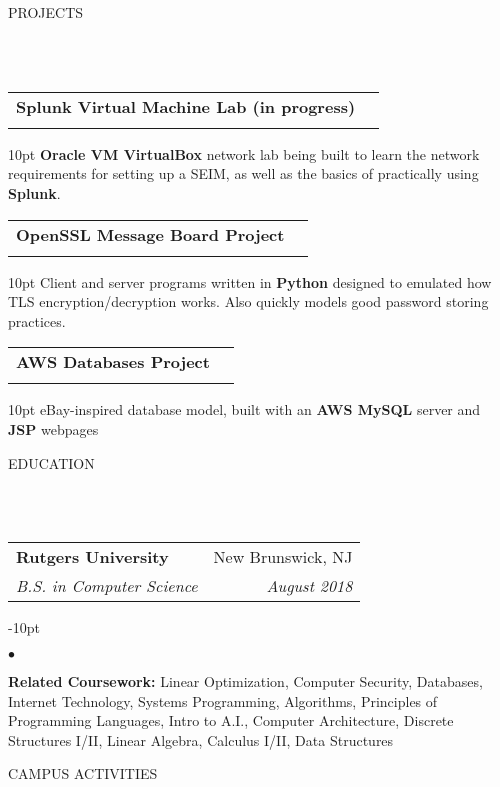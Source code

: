 \documentclass[12pt]{article}
\makeatletter
\newcommand{\header}[1]{
	\vspace*{12pt} %
	{\hspace*{-14pt}\vspace*{6pt} #1}
	\vspace*{-6pt} 
	\lineunder
}
\newcommand{\lineunder}{
	\vspace*{-8pt} \\ 
	\hspace*{-18pt} 
	\hrulefill \\
}
\newcommand{\subheading}[4]{
 	\vspace{5pt}
    	\begin{tabular*}{1.01\textwidth}
    		{l@{\extracolsep{\fill}}r}
      		\hspace{-16pt}\textbf{#1} & #2 \\
      		\hspace{-16pt}\textit{\small#3} & \textit{\small #4} \\
    	\end{tabular*}
    \vspace{-4pt}
}
\newenvironment{achievements}{
\begin{adjustwidth}{-10pt}{}
  \begin{list}{$\bullet$}{
  	\topsep 0pt \itemsep -4pt}}
  	{\vspace*{2pt}\end{list}
\end{adjustwidth}
}
\makeatother
\begin{document}
\header{PROJECTS}


\subheading{Splunk Virtual Machine Lab (in progress)}{}{}{}
	\vspace{-15pt}
	\begin{adjustwidth}{10pt}{}
	\textbf{Oracle VM VirtualBox} network lab being built to learn the network requirements for setting up a SEIM, as well as the basics of practically using \textbf{Splunk}.
	\end{adjustwidth} 

\subheading{OpenSSL Message Board Project}{}{}{}
	\vspace{-15pt}
	\begin{adjustwidth}{10pt}{}
	Client and server programs written in \textbf{Python} designed to emulated how TLS encryption/decryption works. Also quickly models good password storing practices.
	\end{adjustwidth}

\subheading{AWS Databases Project}{}{}{}
	\vspace{-15pt}
	\begin{adjustwidth}{10pt}{}
	eBay-inspired database model, built with an \textbf{AWS MySQL} server and \textbf{JSP} webpages
	\end{adjustwidth}


\header{EDUCATION}

\subheading
	{Rutgers University}{New Brunswick, NJ}
	{B.S. in Computer Science}{August 2018}
	\begin{achievements}	
	\item{\bf Related Coursework:} Linear Optimization, Computer Security, Databases, Internet Technology, Systems Programming, Algorithms, Principles of Programming Languages, Intro to A.I., Computer Architecture, Discrete Structures I/II, Linear Algebra, Calculus I/II, Data Structures
	\end{achievements}


\header{CAMPUS ACTIVITIES}
\end{document}
